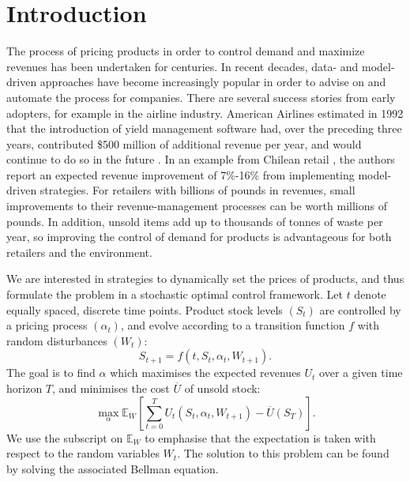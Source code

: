 \documentclass[main.tex]{subfiles}
\begin{document}
\listoftodos

\section{Introduction}
The process of pricing products in order to control demand and
maximize revenues has been undertaken for centuries. In recent
decades, data- and model-driven approaches have become increasingly
popular in order to advise on and automate the process for companies.
There are several success stories from early adopters, for example in
the airline industry.
American Airlines estimated in 1992 that the introduction of yield
management software had, over the preceding three
years, contributed \$500 million of additional revenue per year,
and would continue to do so in the future \cite{smith1992yield}.
In an example from Chilean retail \cite{bitran1998coordinating}, the authors
report an expected revenue improvement of 7\%-16\% from implementing
model-driven strategies.
For retailers with billions of pounds in revenues, small
improvements to their revenue-management processes can be worth millions
of pounds.
In addition, unsold items add up to thousands of tonnes of waste per year, so
improving the control of demand for products is advantageous
for both retailers and the environment.

We are interested in strategies to dynamically set the prices of
products, and thus
formulate the problem in a stochastic optimal control framework.
Let $t$ denote equally spaced, discrete time points.
Product stock levels $(S_t)$ are controlled by a pricing process
$(\alpha_t)$, and evolve according to a transition function $f$ with random disturbances
$(W_t)$:
\begin{equation}
  S_{t+1}=f(t,S_t,\alpha_t,W_{t+1}).
\end{equation}
The goal is to find $\alpha$ which maximises the expected revenues $U_t$ over a
given time horizon $T$, and
minimises the cost $\overline{U}$ of unsold stock:
\begin{equation}
  \max_{\alpha}\mathbb E_W\left[ \sum_{t=0}^TU_t(S_t,\alpha_t,W_{t+1})
    - \overline{U}(S_T)\right].
\end{equation}
We use the subscript on $\mathbb E_W$ to emphasise that the
expectation is taken with respect to the random variables $W_t$.
The solution to this problem can be found by solving the associated
Bellman equation.
\end{document}
